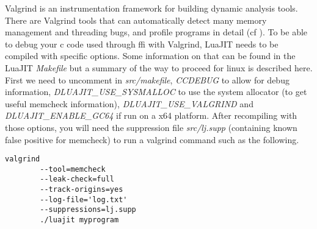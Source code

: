 
Valgrind is an instrumentation framework for building dynamic analysis tools.
There are Valgrind tools that can automatically detect many memory management
and threading bugs, and profile programs in detail (cf \cite{valgrind}). To be
able to debug your c code used through ffi with Valgrind, LuaJIT needs to be
compiled with specific options. Some information on that can be found in the
LuaJIT \emph{Makefile} but a summary of the way to proceed for linux is described
here. First we need to uncomment in \emph{src/makefile}, \emph{CCDEBUG} to
allow for debug information, \emph{DLUAJIT\_USE\_SYSMALLOC} to use the system
allocator (to get useful memcheck information), \emph{DLUAJIT\_USE\_VALGRIND}
and \emph{DLUAJIT\_ENABLE\_GC64} if run on a x64 platform. After recompiling
with those options, you will need the suppression file \emph{src/lj.supp}
(containing known false positive for memcheck) to run a valgrind command such as
the following.

\begin{lstlisting}[style=CStyle]
valgrind
		--tool=memcheck
		--leak-check=full
		--track-origins=yes
		--log-file='log.txt'
		--suppressions=lj.supp
		./luajit myprogram
\end{lstlisting}


